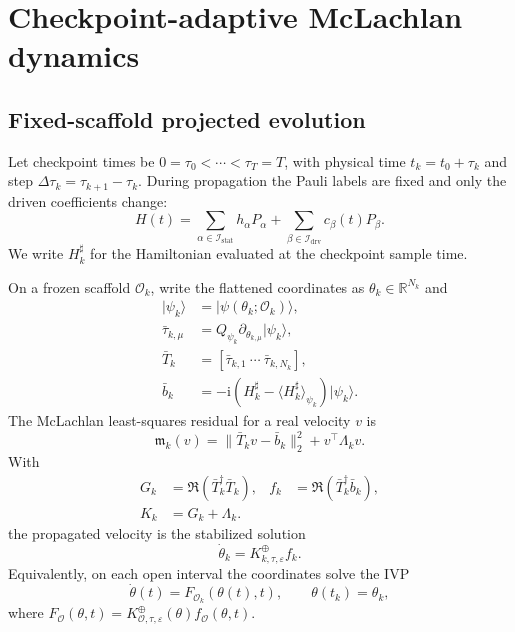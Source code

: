 \documentclass[
  reprint,
  amsmath,
  amssymb,
  aps,
  pra,
  nofootinbib,
  superscriptaddress,
  floatfix
]{revtex4-2}
\newcommand{\Oset}{\mathcal{O}}
\newcommand{\ii}{\mathrm{i}}
\newcommand{\stat}{\mathrm{stat}}
\newcommand{\drv}{\mathrm{drv}}
\newcommand{\eps}{\varepsilon}
\newcommand{\ket}[1]{|#1\rangle}
\newcommand{\expval}[1]{\langle #1\rangle}
\begin{document}
\section{Checkpoint-adaptive McLachlan dynamics}
\label{sec:dynamics_method}

\subsection{Fixed-scaffold projected evolution}

Let checkpoint times be $0=\tau_0<\cdots<\tau_T=T$, with physical time $t_k=t_0+\tau_k$ and step $\Delta\tau_k=\tau_{k+1}-\tau_k$. During propagation the Pauli labels are fixed and only the driven coefficients change:
\begin{equation}
H(t)=\sum_{\alpha\in\mathcal I_{\stat}}h_\alpha P_\alpha
+\sum_{\beta\in\mathcal I_{\drv}}c_\beta(t)P_\beta .
\label{eq:dynamics_sampling}
\end{equation}
We write $H_k^\sharp$ for the Hamiltonian evaluated at the checkpoint sample time.

On a frozen scaffold $\Oset_k$, write the flattened coordinates as $\theta_k\in\mathbb R^{N_k}$ and
\begin{equation}
\begin{aligned}
\ket{\psi_k}&=\ket{\psi(\theta_k;\Oset_k)},\\
\bar\tau_{k,\mu}&=Q_{\psi_k}\partial_{\theta_{k,\mu}}\ket{\psi_k},\\
\bar T_k&=[\bar\tau_{k,1}\ \cdots\ \bar\tau_{k,N_k}],\\
\bar b_k&=-\ii(H_k^\sharp-\expval{H_k^\sharp}_{\psi_k})\ket{\psi_k}.
\end{aligned}
\label{eq:projected_tangents}
\end{equation}
The McLachlan least-squares residual for a real velocity $v$ is
\begin{equation}
\mathfrak m_k(v)=\|\bar T_kv-\bar b_k\|_2^2+v^\top\Lambda_kv .
\label{eq:mclachlan_residual}
\end{equation}
With
\begin{equation}
\begin{aligned}
G_k&=\Re(\bar T_k^\dagger\bar T_k),
&f_k&=\Re(\bar T_k^\dagger\bar b_k),\\
K_k&=G_k+\Lambda_k .
\end{aligned}
\label{eq:mclachlan_metric_force}
\end{equation}
the propagated velocity is the stabilized solution
\begin{equation}
\dot\theta_k=K_{k,\tau,\eps}^{\oplus}f_k .
\label{eq:mclachlan_velocity}
\end{equation}
Equivalently, on each open interval the coordinates solve the IVP
\begin{equation}
\dot\theta(t)=F_{\Oset_k}(\theta(t),t),
\qquad
\theta(t_k)=\theta_k,
\label{eq:dynamics_ivp}
\end{equation}
where $F_{\Oset}(\theta,t)=K_{\Oset,\tau,\eps}^{\oplus}(\theta)f_{\Oset}(\theta,t)$.
\end{document}
